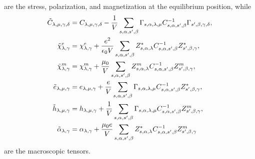 \documentclass[12pt,a4paper]{article}
\begin{document}
are the stress, polarization, and magnetization at the equilibrium position,
while
\begin{align}
\tilde C_{\lambda,\mu,\gamma,\delta}&= C_{\lambda,\mu,\gamma,\delta}
-{1\over V}\sum_{s,\alpha,s',\beta} \Gamma_{s,\alpha,\lambda,\mu}
C^{-1}_{s,\alpha,s',\beta}  \Gamma_{s',\beta,\gamma,\delta},\\
\tilde \chi^e_{\lambda,\gamma}&= \chi^e_{\lambda,\gamma} 
+{e^2 \over \epsilon_0 V} \sum_{s,\alpha,s',\beta} Z^*_{s,\alpha,\lambda}
C^{-1}_{s,\alpha,s',\beta}  Z^*_{s',\beta,\gamma},\\
\tilde \chi^m_{\lambda,\gamma}&= \chi^m_{\lambda,\gamma} 
+{\mu_0 \over V} \sum_{s,\alpha,s',\beta} Z^m_{s,\alpha,\lambda}
C^{-1}_{s,\alpha,s',\beta}  Z^m_{s',\beta,\gamma}, \\
\tilde e_{\lambda,\mu,\gamma}&= e_{\lambda,\mu,\gamma}
+{e\over V}\sum_{s,\alpha,s',\beta} \Gamma_{s,\alpha,\lambda,\mu}
C^{-1}_{s,\alpha,s',\beta} Z^*_{s',\beta,\gamma}
,\\
\tilde h_{\lambda,\mu,\gamma}&= h_{\lambda,\mu,\gamma}
+{1\over V}\sum_{s,\alpha,s',\beta} \Gamma_{s,\alpha,\lambda,\mu}
C^{-1}_{s,\alpha,s',\beta} Z^m_{s',\beta,\gamma},\\
\tilde \alpha_{\lambda,\gamma}&= \alpha_{\lambda,\gamma}
+{\mu_0 e \over V}\sum_{s,\alpha,s',\beta} Z^*_{s,\alpha,\lambda}
C^{-1}_{s,\alpha,s',\beta}  Z^m_{s',\beta,\gamma}
\end{align}
are the macroscopic tensors.
\\
\end{document}

